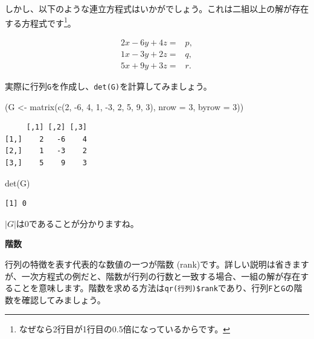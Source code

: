 \documentclass[
  a4paper,
  pandoc,
  ja=standard,
  jafont=haranoaji]{bxjsbook}
\newenvironment{Shaded}{\begin{snugshade}}{\end{snugshade}}
\newcommand{\AttributeTok}[1]{\textcolor[rgb]{0.00,0.48,0.65}{#1}}
\newcommand{\DecValTok}[1]{\textcolor[rgb]{0.68,0.00,0.00}{#1}}
\newcommand{\FunctionTok}[1]{\textcolor[rgb]{0.28,0.35,0.67}{#1}}
\newcommand{\NormalTok}[1]{\textcolor[rgb]{0.00,0.48,0.65}{#1}}
\newcommand{\OtherTok}[1]{\textcolor[rgb]{0.00,0.48,0.65}{#1}}
\newcommand{\SpecialCharTok}[1]{\textcolor[rgb]{0.37,0.37,0.37}{#1}}
\begin{document}
しかし、以下のような連立方程式はいかがでしょう。これは二組以上の解が存在する方程式です\footnote{なぜなら2行目が1行目の0.5倍になっているからです。}。

\begin{align}
2x - 6y + 4z = & p, \\
1x - 3y + 2z = & q, \\
5x + 9y + 3z = & r.
\end{align}

実際に行列\texttt{G}を作成し、\texttt{det(G)}を計算してみましょう。

\begin{Shaded}
\begin{Highlighting}[numbers=left,,]
\NormalTok{(G }\OtherTok{\textless{}{-}} \FunctionTok{matrix}\NormalTok{(}\FunctionTok{c}\NormalTok{(}\DecValTok{2}\NormalTok{, }\SpecialCharTok{{-}}\DecValTok{6}\NormalTok{, }\DecValTok{4}\NormalTok{, }\DecValTok{1}\NormalTok{, }\SpecialCharTok{{-}}\DecValTok{3}\NormalTok{, }\DecValTok{2}\NormalTok{, }\DecValTok{5}\NormalTok{, }\DecValTok{9}\NormalTok{, }\DecValTok{3}\NormalTok{), }\AttributeTok{nrow =} \DecValTok{3}\NormalTok{, }\AttributeTok{byrow =} \DecValTok{3}\NormalTok{))}
\end{Highlighting}
\end{Shaded}

\begin{verbatim}
     [,1] [,2] [,3]
[1,]    2   -6    4
[2,]    1   -3    2
[3,]    5    9    3
\end{verbatim}

\begin{Shaded}
\begin{Highlighting}[numbers=left,,]
\FunctionTok{det}\NormalTok{(G)}
\end{Highlighting}
\end{Shaded}

\begin{verbatim}
[1] 0
\end{verbatim}

\(|G|\)は0であることが分かりますね。

\textbf{階数}

行列の特徴を表す代表的な数値の一つが階数
(rank)です。詳しい説明は省きますが、一次方程式の例だと、階数が行列の行数と一致する場合、一組の解が存在することを意味します。階数を求める方法は\texttt{qr(行列)\$rank}であり、行列\texttt{F}と\texttt{G}の階数を確認してみましょう。

\begin{Shaded}
\end{Shaded}
\end{document}
